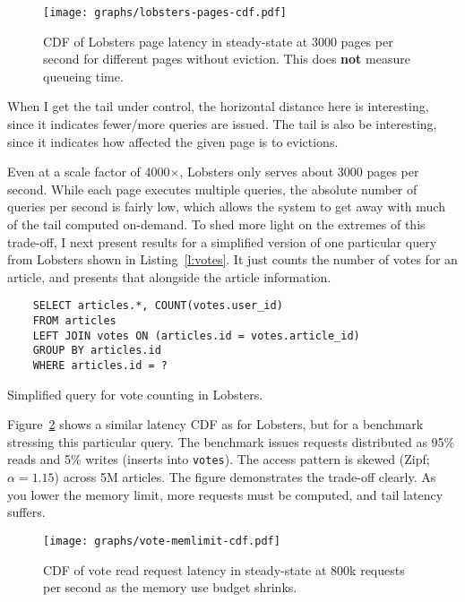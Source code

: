 \begin{figure}[ht]
  \centering
  \texttt{[image: graphs/lobsters-pages-cdf.pdf]}
  \caption{CDF of Lobsters page latency in steady-state at 3000 pages per second
  for different pages without eviction. This does \textbf{not} measure queueing
  time.}
  \label{f:lobsters-pages-latency}
\end{figure}

\begin{inprogress}
  When I get the tail under control, the horizontal distance here is
  interesting, since it indicates fewer/more queries are issued. The tail is
  also be interesting, since it indicates how affected the given page is to
  evictions.
\end{inprogress}

Even at a scale factor of 4000$\times$, Lobsters only serves about 3000 pages
per second. While each page executes multiple queries, the absolute number of
queries per second is fairly low, which allows the system to get away with much
of the tail computed on-demand. To shed more light on the extremes of this
trade-off, I next present results for a simplified version of one particular
query from Lobsters shown in Listing~\ref{l:votes}. It just counts the number of
votes for an article, and presents that alongside the article information.

\begin{listing}[ht]
  \begin{verbatim}
    SELECT articles.*, COUNT(votes.user_id)
    FROM articles
    LEFT JOIN votes ON (articles.id = votes.article_id)
    GROUP BY articles.id
    WHERE articles.id = ?
  \end{verbatim}
  \caption{Simplified query for vote counting in Lobsters.}
  \label{l:votes}
\end{listing}

Figure~\ref{f:vote-mem-latency} shows a similar latency CDF as for Lobsters, but
for a benchmark stressing this particular query. The benchmark issues requests
distributed as 95\% reads and 5\% writes (inserts into \texttt{votes}). The
access pattern is skewed (Zipf; $\alpha = 1.15$) across 5M articles. The figure
demonstrates the trade-off clearly. As you lower the memory limit, more requests
must be computed, and tail latency suffers.

\begin{figure}[ht]
  \centering
  \texttt{[image: graphs/vote-memlimit-cdf.pdf]}
  \caption{CDF of vote read request latency in steady-state at 800k requests per
  second as the memory use budget shrinks.}
  \label{f:vote-mem-latency}
\end{figure}

